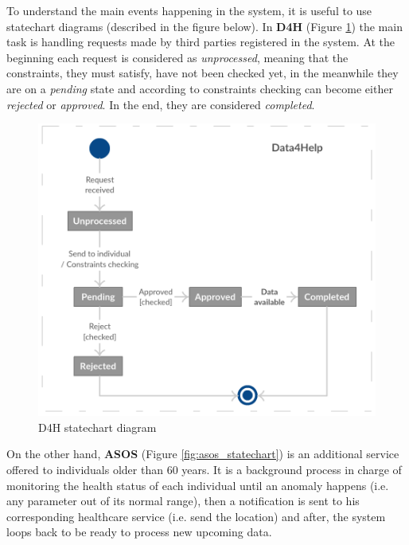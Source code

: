 \documentclass[hidelinks, 12pt]{report}
\begin{document}
	To understand the main events happening in the system, it is useful to use statechart diagrams (described in the figure below). In \textbf {D4H} (Figure \ref{fig:d4h_statechart}) the main task is handling requests made by third parties registered in the system. At the beginning each request is considered as \textit{unprocessed}, meaning that the constraints, they must satisfy, have not been checked yet, in the meanwhile they are on a \textit{pending} state and according to constraints checking can become either \textit{rejected} or \textit{approved}. In the end, they are considered \textit{completed}. \\
	
	\begin{figure}[H]
		\centering
		\includegraphics[scale=0.55]{Diagrams/d4h_statechart.png}
		\caption[D4H statechart diagram]{D4H statechart diagram}
		\label{fig:d4h_statechart}
	\end{figure}
	
	On the other hand, \textbf{ASOS} (Figure \ref{fig:asos_statechart}) is an additional service offered to individuals older than 60 years. It is a background process in charge of monitoring the health status of each individual until an anomaly happens (i.e. any parameter out of its normal range), then a notification is sent to his corresponding healthcare service (i.e. send the location) and after, the system loops back to be ready to process new upcoming data. \\
	
\end{document}

